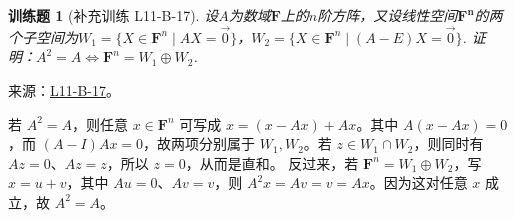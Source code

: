 \documentclass[12pt,fontset=fandol]{ctexart}
\newtheorem{exercise}{训练题}[section]
\begin{document}
\begin{exercise}[补充训练 L11-B-17]\label{prob:L11-B-17}
设$A$为数域$\mathbf{F}$上的$n$阶方阵，又设线性空间$\mathbf{F^n}$的两个子空间为$W_1=\{X\in\mathbf{F}^n \mid AX=\vec{0}\}$，$W_2=\{X\in\mathbf{F}^n \mid (A-E)X=\vec{0}\}$. 证明：$A^2=A \iff \mathbf{F}^n=W_1\oplus W_2$.
\end{exercise}
\noindent 来源：\href{https://github.com/yhwu-is/Linear-Algebra-Left-Undone/blob/new/%E8%AE%B2%E4%B9%89/%E4%B8%93%E9%A2%98/11%20%E6%9C%9D%E8%8A%B1%E5%A4%95%E6%8B%BE.tex}{L11-B-17}。
\begin{solve}
若 $A^2=A$，则任意 $x\in\mathbf F^n$ 可写成 $x=(x-Ax)+Ax$。其中 $A(x-Ax)=0$，而 $(A-I)Ax=0$，故两项分别属于 $W_1,W_2$。若 $z\in W_1\cap W_2$，则同时有 $Az=0$、$Az=z$，所以 $z=0$，从而是直和。
反过来，若 $\mathbf F^n=W_1\oplus W_2$，写 $x=u+v$，其中 $Au=0$、$Av=v$，则 $A^2x=Av=v=Ax$。因为这对任意 $x$ 成立，故 $A^2=A$。
\end{solve}
\end{document}
